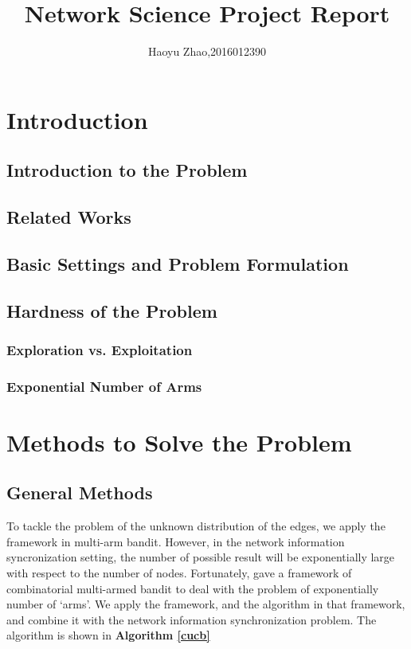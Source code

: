 \documentclass{article}
\title{\bf\huge Network Science Project Report}
\author{Haoyu Zhao,2016012390}
\date{}
\theoremstyle{plain}
\theoremstyle{definition}
\theoremstyle{remark}
\begin{document}
    \maketitle

    \begin{abstract}

    \end{abstract}

    \section{Introduction}
    \subsection{Introduction to the Problem}

    \subsection{Related Works}

    \subsection{Basic Settings and Problem Formulation}

    \subsection{Hardness of the Problem}
    \subsubsection{Exploration vs. Exploitation}

    \subsubsection{Exponential Number of Arms}

    \section{Methods to Solve the Problem}
    \subsection{General Methods}
    To tackle the problem of the unknown distribution of the edges, we apply the framework in multi-arm bandit. However, in the network information syncronization setting, the number of possible result will be exponentially large with respect to the number of nodes. Fortunately, \cite{chen2013combinatorial} gave a framework of combinatorial multi-armed bandit to deal with the problem of exponentially number of `arms'. We apply the framework, and the algorithm in that framework, and combine it with the network information synchronization problem. The algorithm is shown in \textbf{Algorithm \ref{cucb}}
\end{document}
